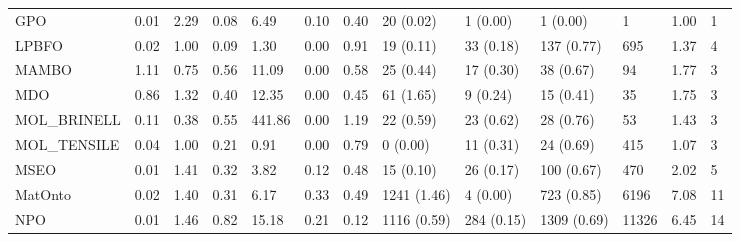 \begin{table}
\begin{tabular}{m{3.5cm}m{2cm}m{2cm}m{2cm}m{2cm}m{2cm}m{2cm}m{2cm}m{2cm}m{2cm}m{2cm}m{2cm}m{2cm}}
GPO                     &                0.01 &                  2.29 &                   0.08 &               6.49 &               0.10 &                  0.40 &      20 (0.02) &    1 (0.00) &     1 (0.00) &               1 &     1.00 &          1 \\
LPBFO                   &                0.02 &                  1.00 &                   0.09 &               1.30 &               0.00 &                  0.91 &      19 (0.11) &   33 (0.18) &   137 (0.77) &             695 &     1.37 &          4 \\
MAMBO                   &                1.11 &                  0.75 &                   0.56 &              11.09 &               0.00 &                  0.58 &      25 (0.44) &   17 (0.30) &    38 (0.67) &              94 &     1.77 &          3 \\
MDO                     &                0.86 &                  1.32 &                   0.40 &              12.35 &               0.00 &                  0.45 &      61 (1.65) &    9 (0.24) &    15 (0.41) &              35 &     1.75 &          3 \\
MOL\_BRINELL             &                0.11 &                  0.38 &                   0.55 &             441.86 &               0.00 &                  1.19 &      22 (0.59) &   23 (0.62) &    28 (0.76) &              53 &     1.43 &          3 \\
MOL\_TENSILE             &                0.04 &                  1.00 &                   0.21 &               0.91 &               0.00 &                  0.79 &       0 (0.00) &   11 (0.31) &    24 (0.69) &             415 &     1.07 &          3 \\
MSEO                    &                0.01 &                  1.41 &                   0.32 &               3.82 &               0.12 &                  0.48 &      15 (0.10) &   26 (0.17) &   100 (0.67) &             470 &     2.02 &          5 \\
MatOnto                 &                0.02 &                  1.40 &                   0.31 &               6.17 &               0.33 &                  0.49 &    1241 (1.46) &    4 (0.00) &   723 (0.85) &            6196 &     7.08 &         11 \\
NPO                     &                0.01 &                  1.46 &                   0.82 &              15.18 &               0.21 &                  0.12 &    1116 (0.59) &  284 (0.15) &  1309 (0.69) &           11326 &     6.45 &         14 \\

\end{tabular}
\end{table}
